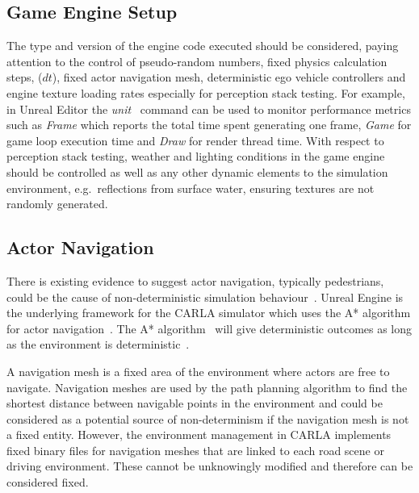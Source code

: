 \documentclass[letterpaper, 10 pt, journal, twoside]{IEEEtran}
\begin{document}
\subsection{Game Engine Setup}
The type and version of the engine code executed should be considered, paying attention to the control of pseudo-random numbers, fixed physics calculation steps, ($dt$), fixed actor navigation mesh, deterministic ego vehicle controllers and engine texture loading rates especially for perception stack testing. %
%
For example, in Unreal Editor the \textit{unit}~\cite{stat_commands} command can be used to monitor performance metrics such as \textit{Frame} which reports 
the total time spent generating one frame, \textit{Game} for game loop execution time and \textit{Draw} for render thread time. 
%
With respect to perception stack testing, weather and lighting conditions in the game engine should be controlled as well as any other dynamic elements to the simulation environment, e.g.\ reflections from surface water, ensuring textures are not randomly generated. 




\subsection{Actor Navigation}
There is existing evidence to suggest actor navigation, typically pedestrians, could be the cause of non-deterministic simulation behaviour~\cite{CARLABenchmark}.
% 
Unreal Engine is the underlying framework for the CARLA simulator which uses the A* algorithm for actor navigation~\cite{a_Star_oreilly}.
%
The A* algorithm~\cite{AStarBook} will give deterministic outcomes as long as the environment is deterministic~\cite{AirsimUnrealArticle, UnrealAIDocumentation}. 

A navigation mesh is a fixed area of the environment where actors are free to navigate.
%
Navigation meshes are used by the path planning algorithm to find the shortest distance between navigable points in the environment and could be considered as a potential source of non-determinism if the navigation mesh is not a fixed entity. %
%
However, the environment management in CARLA implements fixed binary files for navigation meshes that are linked to each road scene or driving environment. These cannot be unknowingly modified and therefore can be considered fixed. 
\end{document}
